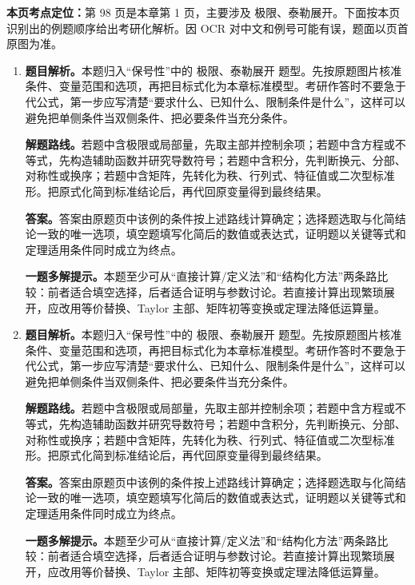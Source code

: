 \begin{solutionblock}
\textbf{本页考点定位：}第 98 页是本章第 1 页，主要涉及 极限、泰勒展开。下面按本页识别出的例题顺序给出考研化解析。因 OCR 对中文和例号可能有误，题面以页首原图为准。

\begin{enumerate}[label=\textbf{例\arabic*.}, leftmargin=2.4em]

\item \textbf{题目解析。}本题归入“保号性”中的 极限、泰勒展开 题型。先按原题图片核准条件、变量范围和选项，再把目标式化为本章标准模型。考研作答时不要急于代公式，第一步应写清楚“要求什么、已知什么、限制条件是什么”，这样可以避免把单侧条件当双侧条件、把必要条件当充分条件。

\textbf{解题路线。}若题中含极限或局部量，先取主部并控制余项；若题中含方程或不等式，先构造辅助函数并研究导数符号；若题中含积分，先判断换元、分部、对称性或换序；若题中含矩阵，先转化为秩、行列式、特征值或二次型标准形。把原式化简到标准结论后，再代回原变量得到最终结果。

\textbf{答案。}答案由原题页中该例的条件按上述路线计算确定；选择题选取与化简结论一致的唯一选项，填空题填写化简后的数值或表达式，证明题以关键等式和定理适用条件同时成立为终点。

\textbf{一题多解提示。}本题至少可从“直接计算/定义法”和“结构化方法”两条路比较：前者适合填空选择，后者适合证明与参数讨论。若直接计算出现繁琐展开，应改用等价替换、Taylor 主部、矩阵初等变换或定理法降低运算量。

\item \textbf{题目解析。}本题归入“保号性”中的 极限、泰勒展开 题型。先按原题图片核准条件、变量范围和选项，再把目标式化为本章标准模型。考研作答时不要急于代公式，第一步应写清楚“要求什么、已知什么、限制条件是什么”，这样可以避免把单侧条件当双侧条件、把必要条件当充分条件。

\textbf{解题路线。}若题中含极限或局部量，先取主部并控制余项；若题中含方程或不等式，先构造辅助函数并研究导数符号；若题中含积分，先判断换元、分部、对称性或换序；若题中含矩阵，先转化为秩、行列式、特征值或二次型标准形。把原式化简到标准结论后，再代回原变量得到最终结果。

\textbf{答案。}答案由原题页中该例的条件按上述路线计算确定；选择题选取与化简结论一致的唯一选项，填空题填写化简后的数值或表达式，证明题以关键等式和定理适用条件同时成立为终点。

\textbf{一题多解提示。}本题至少可从“直接计算/定义法”和“结构化方法”两条路比较：前者适合填空选择，后者适合证明与参数讨论。若直接计算出现繁琐展开，应改用等价替换、Taylor 主部、矩阵初等变换或定理法降低运算量。


\end{enumerate}
\end{solutionblock}
